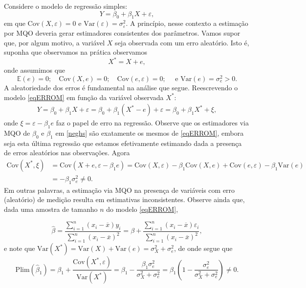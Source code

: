\documentclass[
]{book}
\theoremstyle{definition}
\theoremstyle{definition}
\theoremstyle{definition}
\theoremstyle{remark}
\begin{document}
Considere o modelo de regressão simples:
\begin{equation}
Y = \beta_0 + \beta_1 X + \varepsilon,
\label{eq:ERROM}
\end{equation}
em que \(\mbox{Cov}(X,\varepsilon) = 0\) e \(\mbox{Var}(\varepsilon)=\sigma^2_\varepsilon\). A princípio, nesse contexto a estimação por MQO deveria gerar estimadores consistentes dos parâmetros. Vamos supor que, por algum motivo, a variável \(X\) seja observada com um erro aleatório. Isto é, suponha que observamos na prática observamos
\begin{equation}
X^* = X + e,
\label{eq:ERROM1}
\end{equation}
onde assumimos que
\[\mathbb{E}(e) = 0; \quad \mbox{Cov}(X,e) = 0; \quad \mbox{Cov}(e,\varepsilon) = 0; \quad \mbox{ e }  \mbox{Var}(e)=\sigma_e^2>0.\]
A aleatoriedade dos erros é fundamental na análise que segue. Reescrevendo o modelo \ref{eqERROM} em função da variável observada \(X^*\):
\begin{align}
Y = \beta_0 + \beta_1 X + \varepsilon = \beta_0 + \beta_1( X^* - e) + \varepsilon=\beta_0 + \beta_1 X^* + \xi,
\label{eq:neghs}
\end{align}
onde \(\xi=\varepsilon -\beta_1 e\) faz o papel de erro na regressão. Observe que os estimadores via MQO de \(\beta_0\) e \(\beta_1\) em \ref{neghs} são exatamente os mesmos de \ref{eqERROM}, embora seja esta última regressão que estamos efetivamente estimando dada a presença de erros aleatórios nas observações. Agora
\begin{align*}
\mbox{Cov}( X^*, \xi )&=\mbox{Cov}(X + e, \varepsilon -\beta_1 e) =  \mbox{Cov}(X,\varepsilon)-\beta_1\mbox{Cov}(X,e)+\mbox{Cov}(e,\varepsilon)-\beta_1\mbox{Var}(e)\\
&=-\beta_1\sigma_e^2\neq 0.
\end{align*}
Em outras palavras, a estimação via MQO na presença de variáveis com erro (aleatório) de medição resulta em estimativas inconsistentes. Observe ainda que, dada uma amostra de tamanho \(n\) do modelo \ref{eqERROM},

\[ \hat{\beta}=\frac{\sum_{i=1}^{n}(x_i-\overline{x})y_i}{\sum_{i=1}^{n}(x_i-\overline{x})^2}
            =\beta+\frac{\sum_{i=1}^{n}(x_i-\overline{x})\varepsilon_i}{\sum_{i=1}^{n}(x_i-\overline{x})^2},\]
e note que \(\mbox{Var}( X^* ) = \mbox{Var}( X ) + \mbox{Var}( e ) = \sigma_{X}^2+\sigma_e^2\), de onde segue que
\[\mathrm{Plim}(\hat\beta_1) = \beta_1 + \frac{\mbox{Cov}(X^*, \varepsilon )}{\mbox{Var}(X^*)}=\beta_1-\frac{ \beta_1 \sigma_e^2}{\sigma_{X}^2 + \sigma_e^2} =\beta_1\left(1-\frac{\sigma_e^2}{\sigma_{X}^2 + \sigma_e^2}\right)\neq 0.\]
\end{document}
